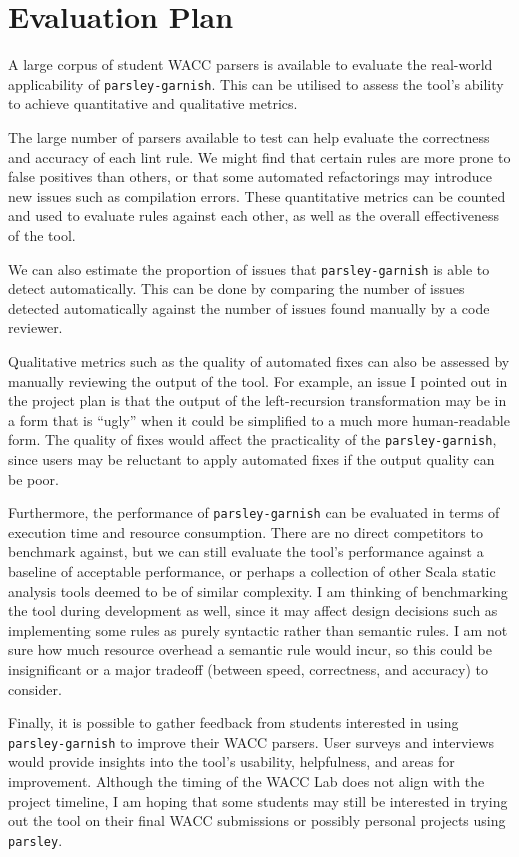 \documentclass[../../main.tex]{subfiles}
\begin{document}
\chapter{Evaluation Plan}

A large corpus of student WACC parsers is available to evaluate the real-world applicability of \texttt{parsley-garnish}.
This can be utilised to assess the tool's ability to achieve quantitative and qualitative metrics.

The large number of parsers available to test can help evaluate the correctness and accuracy of each lint rule.
We might find that certain rules are more prone to false positives than others, or that some automated refactorings may introduce new issues such as compilation errors.
These quantitative metrics can be counted and used to evaluate rules against each other, as well as the overall effectiveness of the tool.

We can also estimate the proportion of issues that \texttt{parsley-garnish} is able to detect automatically.
This can be done by comparing the number of issues detected automatically against the number of issues found manually by a code reviewer.

Qualitative metrics such as the quality of automated fixes can also be assessed by manually reviewing the output of the tool.
For example, an issue I pointed out in the project plan is that the output of the left-recursion transformation may be in a form that is ``ugly'' when it could be simplified to a much more human-readable form.
The quality of fixes would affect the practicality of the \texttt{parsley-garnish}, since users may be reluctant to apply automated fixes if the output quality can be poor.

Furthermore, the performance of \texttt{parsley-garnish} can be evaluated in terms of execution time and resource consumption.
There are no direct competitors to benchmark against, but we can still evaluate the tool's performance against a baseline of acceptable performance, or perhaps a collection of other Scala static analysis tools deemed to be of similar complexity.
I am thinking of benchmarking the tool during development as well, since it may affect design decisions such as implementing some rules as purely syntactic rather than semantic rules.
I am not sure how much resource overhead a semantic rule would incur, so this could be insignificant or a major tradeoff (between speed, correctness, and accuracy) to consider.

Finally, it is possible to gather feedback from students interested in using \texttt{parsley-garnish} to improve their WACC parsers.
User surveys and interviews would provide insights into the tool's usability, helpfulness, and areas for improvement.
Although the timing of the WACC Lab does not align with the project timeline, I am hoping that some students may still be interested in trying out the tool on their final WACC submissions or possibly personal projects using \texttt{parsley}.
\end{document}
